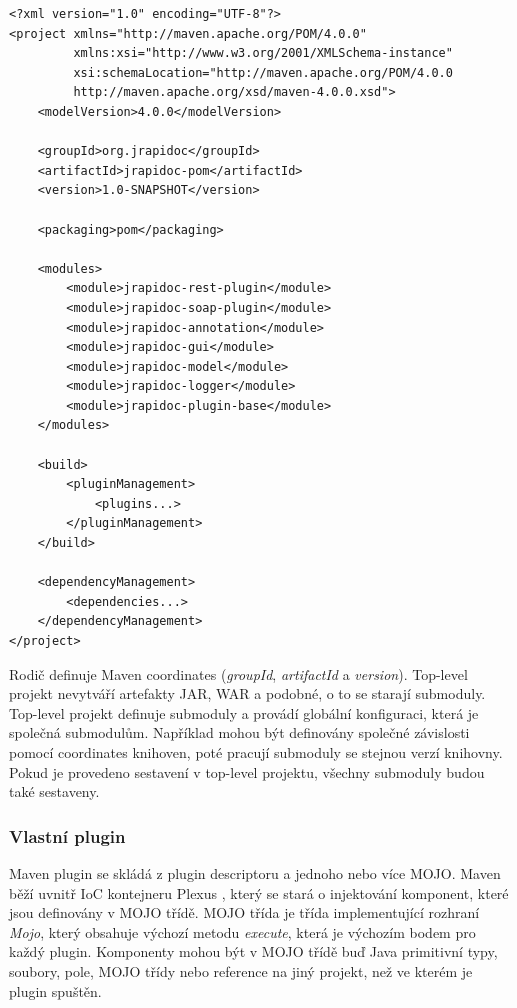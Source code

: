 \documentclass[11pt,twoside,a4paper]{book}
\begin{document}
\begin{lstlisting}[frame=single,caption={Ukázka konfigurace multimodulového
projektu}] 
<?xml version="1.0" encoding="UTF-8"?>
<project xmlns="http://maven.apache.org/POM/4.0.0"
         xmlns:xsi="http://www.w3.org/2001/XMLSchema-instance"
         xsi:schemaLocation="http://maven.apache.org/POM/4.0.0
         http://maven.apache.org/xsd/maven-4.0.0.xsd">
    <modelVersion>4.0.0</modelVersion>

    <groupId>org.jrapidoc</groupId>
    <artifactId>jrapidoc-pom</artifactId>
    <version>1.0-SNAPSHOT</version>

    <packaging>pom</packaging>

    <modules>
        <module>jrapidoc-rest-plugin</module>
        <module>jrapidoc-soap-plugin</module>
        <module>jrapidoc-annotation</module>
        <module>jrapidoc-gui</module>
        <module>jrapidoc-model</module>
        <module>jrapidoc-logger</module>
        <module>jrapidoc-plugin-base</module>
    </modules>

    <build>
        <pluginManagement>
            <plugins...>
        </pluginManagement>
    </build>

    <dependencyManagement>
        <dependencies...>
    </dependencyManagement>
</project>
\end{lstlisting}

Rodič definuje Maven coordinates ({\em groupId}, {\em artifactId} a {\em
version}).
Top-level projekt nevytváří artefakty JAR, WAR a podobné, o to se starají submoduly. Top-level projekt definuje
submoduly a provádí globální konfiguraci, která je společná submodulům. Například mohou
být definovány společné závislosti pomocí coordinates knihoven, poté pracují submoduly se
stejnou verzí knihovny. Pokud je provedeno sestavení v top-level projektu,
všechny submoduly budou také sestaveny.

\subsubsection{Vlastní plugin}

Maven plugin se skládá z plugin descriptoru a jednoho nebo více MOJO. Maven běží
uvnitř IoC kontejneru Plexus \cite{PlexusHome}, který se stará o injektování komponent,
které jsou definovány v MOJO třídě. MOJO třída je třída implementující rozhraní {\em Mojo},
který obsahuje výchozí metodu {\em execute}, která je výchozím bodem pro každý
plugin.
Komponenty mohou být v MOJO třídě buď Java primitivní typy, soubory, pole, MOJO
třídy nebo reference na jiný projekt, než ve kterém je plugin spuštěn.
\end{document}
